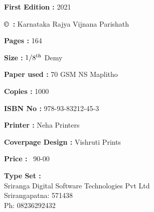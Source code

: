 \begin{center}

\vspace{-.2cm}
{\rm {\bfseries First Edition :} 2021}

\vfill

{\rm {\bfseries \copyright ~:} Karnataka Rajya Vijnana Parishath}

\vfill

{\rm {\bfseries Pages :} 164}

\vfill

{\rm {\bfseries Size :} $1/8^{\rm th}$ Demy}

\vfill

{\rm {\bfseries Paper used :} 70 GSM NS Maplitho}

\vfill

{\rm {\bfseries Copies :} 1000}

\vfill

{\rm {\bfseries ISBN No :} 978-93-83212-45-3} 

\vfill

{\rm {\bfseries Printer :}  Neha Printers}

\vfill

{\rm {\bfseries Coverpage Design :}  Vishruti Prints}

\vfill

{\rm {\bfseries Price :}  \rupee\ 90-00}

\end{center}

\begin{center}
{\rm {\bfseries Type Set :} \\
			Sriranga Digital Software Technologies Pvt Ltd\\ Srirangapatna: 571438\\ Ph: 08236292432}
   \end{center}
  
   







